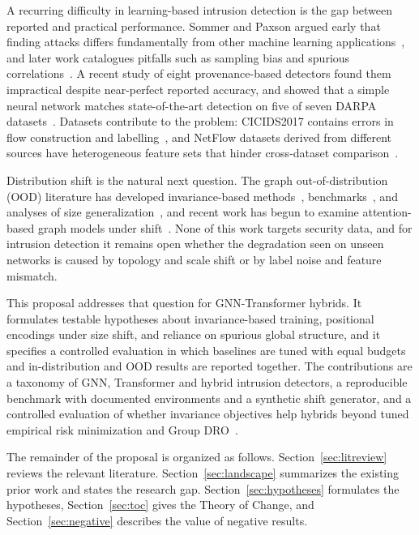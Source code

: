 \documentclass[a4paper,10pt]{article}
\begin{document}
A recurring difficulty in learning-based intrusion detection is the gap between reported and practical performance. Sommer and Paxson argued early that finding attacks differs fundamentally from other machine learning applications~\cite{sommer2010closed}, and later work catalogues pitfalls such as sampling bias and spurious correlations~\cite{arp2022dos}. A recent study of eight provenance-based detectors found them impractical despite near-perfect reported accuracy, and showed that a simple neural network matches state-of-the-art detection on five of seven DARPA datasets~\cite{bilot2025simpler}. Datasets contribute to the problem: CICIDS2017 contains errors in flow construction and labelling~\cite{engelen2021cicids}, and NetFlow datasets derived from different sources have heterogeneous feature sets that hinder cross-dataset comparison~\cite{sarhan2021netflow}.

Distribution shift is the natural next question. The graph out-of-distribution (OOD) literature has developed invariance-based methods~\cite{wu2022dir,wu2022eerm}, benchmarks~\cite{gui2022good}, and analyses of size generalization~\cite{yehudai2021size}, and recent work has begun to examine attention-based graph models under shift~\cite{guo2024ood,liao2026igt}. None of this work targets security data, and for intrusion detection it remains open whether the degradation seen on unseen networks is caused by topology and scale shift or by label noise and feature mismatch.

This proposal addresses that question for GNN-Transformer hybrids. It formulates testable hypotheses about invariance-based training, positional encodings under size shift, and reliance on spurious global structure, and it specifies a controlled evaluation in which baselines are tuned with equal budgets and in-distribution and OOD results are reported together. The contributions are a taxonomy of GNN, Transformer and hybrid intrusion detectors, a reproducible benchmark with documented environments and a synthetic shift generator, and a controlled evaluation of whether invariance objectives help hybrids beyond tuned empirical risk minimization and Group DRO~\cite{sagawa2020dro}.

The remainder of the proposal is organized as follows. Section~\ref{sec:litreview} reviews the relevant literature. Section~\ref{sec:landscape} summarizes the existing prior work and states the research gap. Section~\ref{sec:hypotheses} formulates the hypotheses, Section~\ref{sec:toc} gives the Theory of Change, and Section~\ref{sec:negative} describes the value of negative results.
\end{document}
